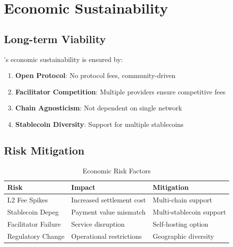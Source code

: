 \section{Economic Sustainability}
\label{sec:sustainability}

\subsection{Long-term Viability}

\tprotocol{}'s economic sustainability is ensured by:

\begin{enumerate}
    \item \textbf{Open Protocol}: No protocol fees, community-driven
    \item \textbf{Facilitator Competition}: Multiple providers ensure competitive fees
    \item \textbf{Chain Agnosticism}: Not dependent on single network
    \item \textbf{Stablecoin Diversity}: Support for multiple stablecoins
\end{enumerate}

\subsection{Risk Mitigation}

\begin{table}[htbp]
\centering
\caption{Economic Risk Factors}
\label{tab:economic-risks}
\begin{tabular}{l p{4.5cm} p{4cm}}
\toprule
\textbf{Risk} & \textbf{Impact} & \textbf{Mitigation} \\
\midrule
L2 Fee Spikes & Increased settlement cost & Multi-chain support \\
Stablecoin Depeg & Payment value mismatch & Multi-stablecoin support \\
Facilitator Failure & Service disruption & Self-hosting option \\
Regulatory Change & Operational restrictions & Geographic diversity \\
\bottomrule
\end{tabular}
\end{table}

